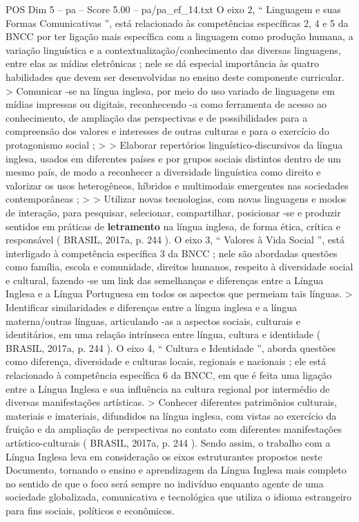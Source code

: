 \begin{textsample}{POS Dim 5 – pa – Score 5.00 – pa/pa\_ef\_14.txt}
O eixo 2, “ Linguagem e suas Formas Comunicativas ”, está relacionado às competências específicas 2, 4 e 5 da BNCC por ter ligação mais específica com a linguagem como produção humana, a variação linguística e a contextualização/conhecimento das diversas linguagens, entre elas as mídias eletrônicas ; nele se dá especial importância às quatro habilidades que devem ser desenvolvidas no ensino deste componente curricular. > Comunicar -se na língua inglesa, por meio do uso variado de linguagens em mídias impressas ou digitais, reconhecendo -a como ferramenta de acesso ao conhecimento, de ampliação das perspectivas e de possibilidades para a compreensão dos valores e interesses de outras culturas e para o exercício do protagonismo social ; > > Elaborar repertórios linguístico-discursivos da língua inglesa, usados em diferentes países e por grupos sociais distintos dentro de um mesmo país, de modo a reconhecer a diversidade linguística como direito e valorizar os usos heterogêneos, híbridos e multimodais emergentes nas sociedades contemporâneas ; > > Utilizar novas tecnologias, com novas linguagens e modos de interação, para pesquisar, selecionar, compartilhar, posicionar -se e produzir sentidos em práticas de \textbf{letramento} na língua inglesa, de forma ética, crítica e responsável ( BRASIL, 2017a, p. 244 ).
O eixo 3, “ Valores à Vida Social ”, está interligado à competência específica 3 da BNCC ; nele são abordadas questões como família, escola e comunidade, direitos humanos, respeito à diversidade social e cultural, fazendo -se um link das semelhanças e diferenças entre a Língua Inglesa e a Língua Portuguesa em todos os aspectos que permeiam tais línguas. > Identificar similaridades e diferenças entre a língua inglesa e a língua materna/outras línguas, articulando -as a aspectos sociais, culturais e identitários, em uma relação intrínseca entre língua, cultura e identidade ( BRASIL, 2017a, p. 244 ).
O eixo 4, “ Cultura e Identidade ”, aborda questões como diferença, diversidade e culturas locais, regionais e nacionais ; ele está relacionado à competência específica 6 da BNCC, em que é feita uma ligação entre a Língua Inglesa e sua influência na cultura regional por intermédio de diversas manifestações artísticas. > Conhecer diferentes patrimônios culturais, materiais e imateriais, difundidos na língua inglesa, com vistas ao exercício da fruição e da ampliação de perspectivas no contato com diferentes manifestações artístico-culturais ( BRASIL, 2017a, p. 244 ).
Sendo assim, o trabalho com a Língua Inglesa leva em consideração os eixos estruturantes propostos neste Documento, tornando o ensino e aprendizagem da Língua Inglesa mais completo no sentido de que o foco será sempre no indivíduo enquanto agente de uma sociedade globalizada, comunicativa e tecnológica que utiliza o idioma estrangeiro para fins sociais, políticos e econômicos.

\end{textsample}
